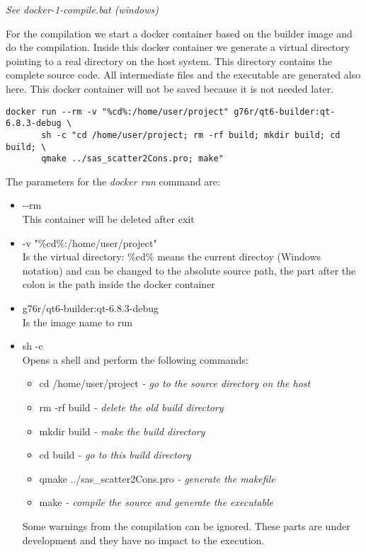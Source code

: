 \documentclass[11pt]{article} %
\begin{document}
\centerline{\it See docker-1-compile.bat (windows)}

For the compilation we start a docker container based on the builder image and do the compilation. Inside this docker container we generate a virtual directory pointing to a real directory on the host system. This directory contains the complete source code. All intermediate files and the executable are generated also here. This docker container will not be saved because it is not needed later.

\begin{lstlisting}[frame=single]
docker run --rm -v "%cd%:/home/user/project" g76r/qt6-builder:qt-6.8.3-debug \
       sh -c "cd /home/user/project; rm -rf build; mkdir build; cd build; \
       qmake ../sas_scatter2Cons.pro; make"
\end{lstlisting}
The parameters for the {\it docker run} command are:
\begin{itemize}\itemsep0pt
\item -{}-rm \\
	This container will be deleted after exit
\item -v "\%cd\%:/home/user/project" \\
	Is the virtual directory: \%cd\% means the current directoy (Windows notation) and can be changed to the absolute source path, the part after the colon is the path inside the docker container
\item g76r/qt6-builder:qt-6.8.3-debug \\
	Is the image name to run
\item sh -c \\
	Opens a shell and perform the following commands:
	\begin{itemize}[*]\itemsep0pt
	\item cd /home/user/project {\it - go to the source directory on the host}
	\item rm -rf build {\it - delete the old build directory}
	\item mkdir build {\it - make the build directory}
	\item cd build {\it - go to this build directory}
	\item qmake ../sas\_scatter2Cons.pro {\it - generate the makefile}
	\item make {\it - compile the source and generate the executable}
	\end{itemize}
	Some warnings from the compilation can be ignored. These parts are under development and they have no impact to the execution.
\end{itemize}
\end{document}
